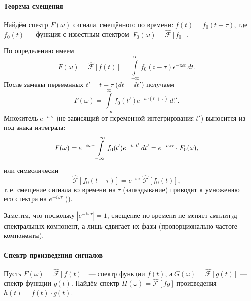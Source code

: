\paragraph{Теорема смещения}
Найдём спектр $F(\omega)$ сигнала, смещённого по времени: $f(t)=f_0(t-\tau)$,
где $f_0(t)$ --- функция с известным спектром~$F_0(\omega)=\hat{\mathcal{F}}[f_0]$.

По определению имеем
\begin{equation*}
  F(\omega)=\hat{\mathcal{F}}[f(t)]=\int\limits_{-\infty}^\infty f_0(t-\tau)e^{-i\omega t}\,dt.
\end{equation*}
После замены переменных $t'=t-\tau$ ($dt=dt'$) получаем
\begin{equation*}
  F(\omega)=\int\limits_{-\infty}^\infty f_0(t') e^{-i\omega(t'+\tau)}\,dt'.
\end{equation*}
Множитель $e^{-i\omega\tau}$ (не зависящий от переменной интегрирования $t'$)
выносится из-под знака интеграла:
\begin{equation}
  \eqmark{task-freq-shift}
  F(\omega)=e^{-i\omega\tau}\int\limits_{-\infty}^\infty f_0(t')e^{-i\omega
t'}\,dt'= e^{-i\omega\tau} \cdot F_0(\omega),
\end{equation}
или символически
\begin{equation*}
\hat{\mathcal{F}}[f_0(t-\tau)] = e^{-i\omega\tau} \hat{\mathcal{F}}[f_0(t)],
\end{equation*}
т.\,е. смещение сигнала во времени на $\tau$ (запаздывание)
приводит к умножению его спектра на $e^{-i\omega\tau}$ ().

Заметим, что поскольку $|e^{-i\omega \tau}|=1$, смещение по времени не меняет
амплитуд спектральных компонент, а лишь сдвигает их фазы (пропорционально частоте
компоненты).

\paragraph{Спектр произведения сигналов}
Пусть $F(\omega)=\hat{\mathcal{F}}[f(t)]$ --- спектр функции $f(t)$, а
$G(\omega)=\hat{\mathcal{F}}[g(t)]$ ---
спектр функции $g(t)$. Найдём спектр $H(\omega)=\hat{\mathcal{F}}[fg]$
произведения $h(t)=f(t)\cdot g(t)$.

